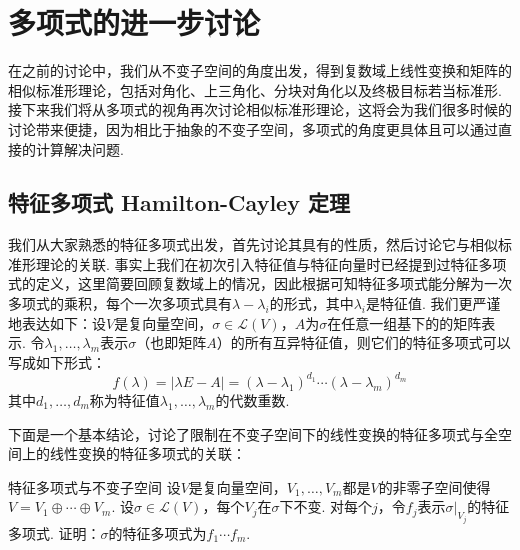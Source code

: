\chapter{多项式的进一步讨论} \label{chap:多项式的进一步讨论}

在之前的讨论中，我们从不变子空间的角度出发，得到复数域上线性变换和矩阵的相似标准形理论，包括对角化、上三角化、分块对角化以及终极目标若当标准形. 接下来我们将从多项式的视角再次讨论相似标准形理论，这将会为我们很多时候的讨论带来便捷，因为相比于抽象的不变子空间，多项式的角度更具体且可以通过直接的计算解决问题.

\section{特征多项式 \quad Hamilton-Cayley 定理}

我们从大家熟悉的特征多项式出发，首先讨论其具有的性质，然后讨论它与相似标准形理论的关联. 事实上我们在初次引入特征值与特征向量时已经提到过特征多项式的定义，这里简要回顾复数域上的情况，因此根据可知特征多项式能分解为一次多项式的乘积，每个一次多项式具有$\lambda-\lambda_i$的形式，其中$\lambda_i$是特征值. 我们更严谨地表达如下：设$V$是复向量空间，$\sigma\in \mathcal{L}(V)$，$A$为$\sigma$在任意一组基下的的矩阵表示. 令$\lambda_1,\ldots,\lambda_m$表示$\sigma$（也即矩阵$A$）的所有互异特征值，则它们的特征多项式可以写成如下形式：
\begin{equation}\label{eq:18:特征多项式}
    f(\lambda)=|\lambda E-A|=(\lambda-\lambda_1)^{d_1}\cdots(\lambda-\lambda_m)^{d_m}
\end{equation}
其中$d_1,\ldots,d_m$称为特征值$\lambda_1,\ldots,\lambda_m$的代数重数.

下面是一个基本结论，讨论了限制在不变子空间下的线性变换的特征多项式与全空间上的线性变换的特征多项式的关联：
\begin{theorem}{}{特征多项式与不变子空间}
    设$V$是复向量空间，$V_1,\ldots,V_m$都是$V$的非零子空间使得$V=V_1\oplus\cdots\oplus V_m$. 设$\sigma\in \mathcal{L}(V)$，每个$V_j$在$\sigma$下不变. 对每个$j$，令$f_j$表示$\sigma\vert_{V_j}$的特征多项式. 证明：$\sigma$的特征多项式为$f_1\cdots f_m$.
\end{theorem}

